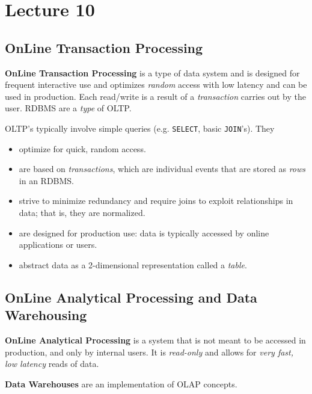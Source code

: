 \documentclass{report}
\newenvironment{definition}[1]{\begin{tcolorbox}[title={Definition: #1}]}{\end{tcolorbox}}
\renewcommand{\bf}[1]{\textbf{{#1}}}
\renewcommand{\tt}[1]{\texttt{{#1}}}
\renewcommand{\it}[1]{\textit{{#1}}}
\begin{document}
\chapter{Lecture 10}
\section{OnLine Transaction Processing}
\begin{definition}{OnLine Transaction Processing (OLTP)}
    \bf{OnLine Transaction Processing} is a type of data system and is designed
    for frequent interactive use and optimizes \it{random} access with low
    latency and can be used in production. Each read/write is a result of a
    \it{transaction} carries out by the user. RDBMS are a \it{type} of OLTP.
\end{definition}

OLTP's typically involve simple queries (e.g. \tt{SELECT}, basic \tt{JOIN}'s).
They
\begin{itemize}[label=$\to$]
    \item optimize for quick, random access.
    \item are based on \it{transactions}, which are individual events that are
        stored as \it{rows} in an RDBMS.
    \item strive to minimize redundancy and require joins to exploit
        relationships in data; that is, they are normalized.
    \item are designed for production use: data is typically accessed by online
        applications or users.
    \item abstract data as a 2-dimensional representation called a \it{table}.
\end{itemize}


\section{OnLine Analytical Processing and Data Warehousing}
\begin{definition}{OnLine Analytical Processing/Data Warehousing (OLAP/DW)}
    \bf{OnLine Analytical Processing} is a system that is not meant to be
    accessed in production, and only by internal users. It is \it{read-only} and
    allows for \it{very fast, low latency} reads of data.
    \vspace{0.5em}

    \bf{Data Warehouses} are an implementation of OLAP concepts.
\end{definition}
\end{document}
